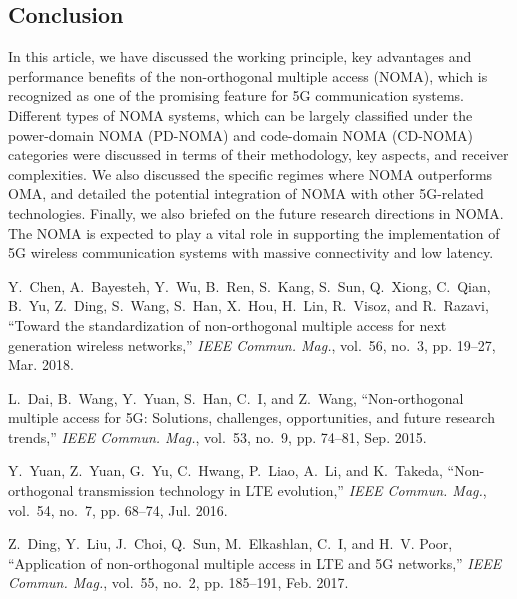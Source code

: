 \begin{multicols}{2}
\section{Conclusion}
In this article, we have discussed the working principle, key advantages and performance benefits of the non-orthogonal multiple access (NOMA), which is recognized as one of the promising feature for 5G communication systems. Different types of NOMA systems, which can be largely classified under the power-domain NOMA (PD-NOMA) and code-domain NOMA (CD-NOMA) categories were discussed in terms of their methodology, key aspects, and receiver complexities. We also discussed the specific regimes where NOMA outperforms OMA, and detailed the potential integration of NOMA with other 5G-related technologies. Finally, we also briefed on the future research directions in NOMA. The NOMA is expected to play a vital role in supporting the implementation of 5G wireless communication systems with massive connectivity and low latency.

\begin{thebibliography}{99}
Y.~{Chen}, A.~{Bayesteh}, Y.~{Wu}, B.~{Ren}, S.~{Kang}, S.~{Sun}, Q.~{Xiong},
  C.~{Qian}, B.~{Yu}, Z.~{Ding}, S.~{Wang}, S.~{Han}, X.~{Hou}, H.~{Lin},
  R.~{Visoz}, and R.~{Razavi}, ``Toward the standardization of non-orthogonal
  multiple access for next generation wireless networks,'' \emph{{IEEE} Commun.
  Mag.}, vol.~56, no.~3, pp. 19--27, Mar. 2018.

L.~{Dai}, B.~{Wang}, Y.~{Yuan}, S.~{Han}, C.~{I}, and Z.~{Wang},
  ``Non-orthogonal multiple access for {5G}: {S}olutions, challenges,
  opportunities, and future research trends,'' \emph{{IEEE} Commun. Mag.},
  vol.~53, no.~9, pp. 74--81, Sep. 2015.

Y.~{Yuan}, Z.~{Yuan}, G.~{Yu}, C.~{Hwang}, P.~{Liao}, A.~{Li}, and K.~{Takeda},
  ``Non-orthogonal transmission technology in {LTE} evolution,'' \emph{{IEEE}
  Commun. Mag.}, vol.~54, no.~7, pp. 68--74, Jul. 2016.

Z.~{Ding}, Y.~{Liu}, J.~{Choi}, Q.~{Sun}, M.~{Elkashlan}, C.~{I}, and H.~V.
  {Poor}, ``Application of non-orthogonal multiple access in {LTE} and {5G}
  networks,'' \emph{{IEEE} Commun. Mag.}, vol.~55, no.~2, pp. 185--191, Feb.
  2017.


\end{thebibliography}
\end{multicols}
